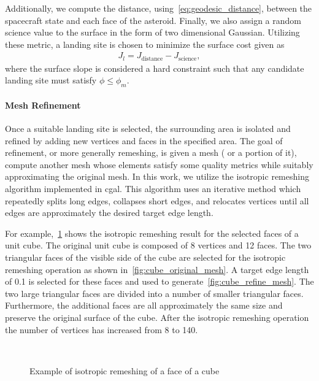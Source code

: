 \documentclass[letterpaper, paper,11pt]{AAS}		%
\begin{document}
Additionally, we compute the distance, using~\cref{eq:geodesic_distance}, between the spacecraft state and each face of the asteroid. 
Finally, we also assign a random science value to the surface in the form of two dimensional Gaussian.
Utilizing these metric, a landing site is chosen to minimize the surface cost given as
\begin{align}\label{eq:surface_cost}
    J_l =  J_{\text{distance}} - J_{\text{science}},
\end{align}
where the surface slope is considered a hard constraint such that any candidate landing site must satisfy \( \phi \leq \phi_m \).

\paragraph{Mesh Refinement}\label{sec:refinement}

Once a suitable landing site is selected, the surrounding area is isolated and refined by adding new vertices and faces in the specified area.
The goal of refinement, or more generally remeshing, is given a mesh ( or a portion of it), compute another mesh whose elements satisfy some quality metrics while suitably approximating the original mesh.
In this work, we utilize the isotropic remeshing algorithm implemented in \gls{cgal}.
This algorithm uses an iterative method which repeatedly splits long edges, collapses short edges, and relocates vertices until all edges are approximately the desired target edge length.

For example,~\cref{fig:cube_remesh} shows the isotropic remeshing result for the selected faces of a unit cube.
The original unit cube is composed of \num{8} vertices and \num{12} faces.
The two triangular faces of the visible side of the cube are selected for the isotropic remeshing operation as shown in~\cref{fig:cube_original_mesh}.
A target edge length of \num{0.1} is selected for these faces and used to generate~\cref{fig:cube_refine_mesh}.
The two large triangular faces are divided into a number of smaller triangular faces.
Furthermore, the additional faces are all approximately the same size and preserve the original surface of the cube.
After the isotropic remeshing operation the number of vertices has increased from \num{8} to \num{140}.
\begin{figure}[htbp]
    \centering
    ~
    \caption{Example of isotropic remeshing of a face of a cube\label{fig:cube_remesh}}
\end{figure}
\end{document}
